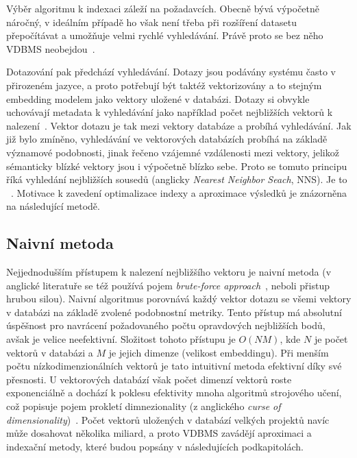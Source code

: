 Výběr algoritmu k indexaci záleží na požadavcích. Obecně bývá výpočetně náročný, v ideálním případě ho však není třeba při rozšíření datasetu přepočítávat a umožňuje velmi rychlé vyhledávání. Právě proto se bez něho VDBMS neobejdou~\cite{vdbms}.

Dotazování pak předchází vyhledávání. Dotazy jsou podávány systému často v přirozeném jazyce, a proto potřebují být taktéž vektorizovány a to stejným embedding modelem jako vektory uložené v databázi. Dotazy si obvykle uchovávají metadata k vyhledávání jako například počet nejbližších vektorů k nalezení~\cite{vdbms}. Vektor dotazu je tak  mezi vektory databáze a probíhá vyhledávání. Jak již bylo zmíněno, vyhledávání ve vektorových databázích probíhá na základě významové podobnosti, jinak řečeno vzájemné vzdálenosti mezi vektory, jelikož sémanticky blízké vektory jsou i výpočetně blízko sebe. Proto se tomuto principu říká vyhledání nejbližších sousedů (anglicky \textit{Nearest Neighbor Seach}, NNS). Je to ~\cite{compreh_survey_vdb}. Motivace k zavedení optimalizace indexy a aproximace výsledků je znázorněna na následující metodě.

\subsection{Naivní metoda}
Nejjednodušším přístupem k nalezení nejbližšího vektoru je naivní metoda (v anglické literatuře se též používá pojem \textit{brute-force approach}~\cite{compreh_survey_vdb}, neboli přistup hrubou silou).
Naivní algoritmus porovnává každý vektor dotazu se všemi vektory v databázi na základě zvolené podobnostní metriky. Tento přístup má absolutní úspěšnost pro navrácení požadovaného počtu opravdových nejbližších bodů, avšak je velice neefektivní. Složitost tohoto přístupu je $O(NM)$, kde $N$ je počet vektorů v databázi a $M$ je jejich dimenze (velikost embeddingu). Při menším počtu nízkodimenzionálních vektorů je tato intuitivní metoda efektivní díky své přesnosti. U vektorových databází však počet dimenzí vektorů roste exponenciálně a dochází k poklesu efektivity mnoha algoritmů strojového učení, což popisuje pojem prokletí dimnezionality (z anglického \textit{curse of dimensionality})~\cite{cursedim}. Počet vektorů uložených v databází velkých projektů navíc může dosahovat několika miliard, a proto VDBMS zavádějí aproximaci a indexační metody, které budou popsány v následujících podkapitolách.

